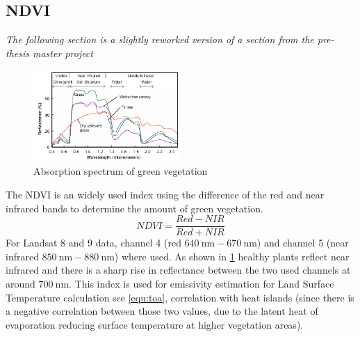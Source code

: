 \subsection{NDVI}
\textit{The following section is a slightly reworked version of a section from the pre-thesis master project~\cite{andrae2023}} 
%
\noindent
\begin{figure}[!htbp]
    \centering
    \includegraphics[width=0.5\textwidth]{img/Reflectance-spectra-of-different-types-of-green-vegetation-compared-to-a-spectral.png}
    \caption{Absorption spectrum of green vegetation\cite[P. 5]{Smith12}\label{fig:absorbtionVeg}}
\end{figure}
The \gls{NDVI} is an widely used index using the difference of the red and near infrared bands to determine the amount of green vegetation. 
\begin{equation}
    NDVI = \frac{Red-NIR}{Red+NIR}
    \label{equ:ndvi}
\end{equation}
For Landsat 8 and 9 data, channel 4 (red $640\ \text{nm} - 670\ \text{nm}$) and channel 5 (near infrared $850\ \text{nm} - 880\ \text{nm}$) where used.
As shown in \cref{fig:absorbtionVeg} healthy plants reflect near infrared and there is a sharp rise in reflectance between the two used channels at around $700\ \text{nm}$. 
%
This index is used for emissivity estimation for Land Surface Temperature calculation see \cref{equ:toa}, correlation with heat islands (since there is a negative correlation between those two values, due to the latent heat of evaporation reducing surface temperature at higher vegetation areas).
